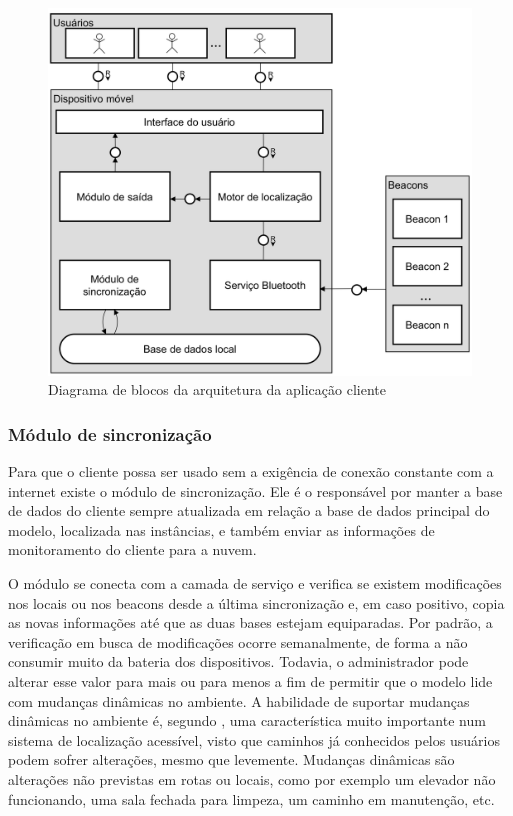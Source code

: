 \documentclass[english,brazilian]{UNISINOSmonografia}
\begin{document}
\FloatBarrier
\begin{figure}[!ht]
	\caption{Diagrama de blocos da arquitetura da aplicação cliente}
	\label{fig:arquiteturaCliente}
	\centering%
	\begin{minipage}{.8\textwidth}
		\includegraphics[width=\textwidth]{imgs/arquiteturaCliente.png}
	\end{minipage}
\end{figure}
\FloatBarrier

		\subsubsection{Módulo de sincronização}
Para que o cliente possa ser usado sem a exigência de conexão constante com a internet existe o módulo de sincronização. Ele é o responsável por manter a base de dados do cliente sempre atualizada em relação a base de dados principal do modelo, localizada nas instâncias, e também enviar as informações de monitoramento do cliente para a nuvem.

O módulo se conecta com a camada de serviço e verifica se existem modificações nos locais ou nos beacons desde a última sincronização e, em caso positivo, copia as novas informações até que as duas bases estejam equiparadas. Por padrão, a verificação em busca de modificações ocorre semanalmente, de forma a não consumir muito da bateria dos dispositivos. Todavia, o administrador pode alterar esse valor para mais ou para menos a fim de permitir que o modelo lide com mudanças dinâmicas no ambiente. A habilidade de suportar mudanças dinâmicas no ambiente é, segundo , uma característica muito importante num sistema de localização acessível, visto que caminhos já conhecidos pelos usuários podem sofrer alterações, mesmo que levemente. Mudanças dinâmicas são alterações não previstas em rotas ou locais, como por exemplo um elevador não funcionando, uma sala fechada para limpeza, um caminho em manutenção, etc.
\end{document}
